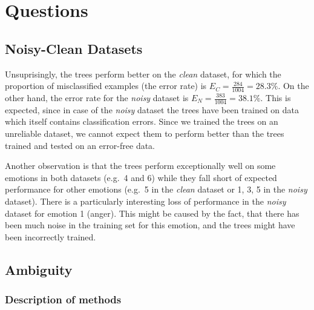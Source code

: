 \documentclass[a4paper]{article}
\begin{document}
\clearpage


\section{Questions}
\subsection{Noisy-Clean Datasets}

Unsuprisingly, the trees perform better on the \emph{clean} dataset, for which the proportion of misclassified examples (the error rate) is $E_C = \frac{284}{1004} = 28.3\%$. On the other hand, the error rate for the \emph{noisy} dataset is $E_N = \frac{383}{1004} = 38.1\%$. This is expected, since in case of the \emph{noisy} dataset the trees have been trained on data which itself contains classification errors. Since we trained the trees on an unreliable dataset, we cannot expect them to perform better than the trees trained and tested on an error-free data.\medskip

Another observation is that the trees perform exceptionally well on some emotions in both datasets (e.g.\ 4 and 6) while they fall short of expected performance for other emotions (e.g.\ 5 in the \emph{clean} dataset or 1, 3, 5 in the \emph{noisy} dataset). There is a particularly interesting loss of performance in the \emph{noisy} dataset for emotion 1 (anger). This might be caused by the fact, that there has been much noise in the training set for this emotion, and the trees might have been incorrectly trained.

\subsection{Ambiguity}
\subsubsection{Description of methods}
\end{document}
